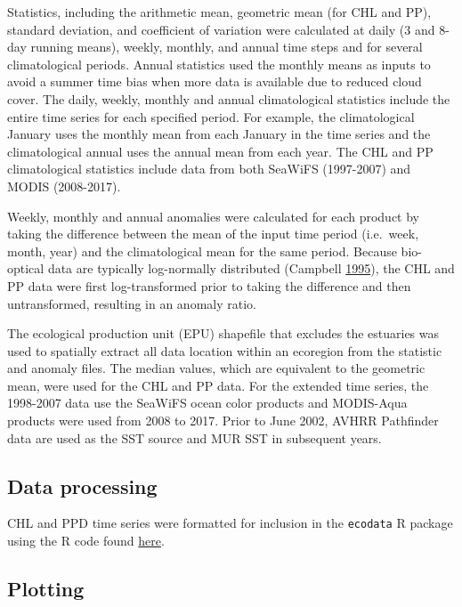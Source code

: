 \documentclass[
]{book}
\begin{document}
Statistics, including the arithmetic mean, geometric mean (for CHL and PP), standard deviation, and coefficient of variation were calculated at daily (3 and 8-day running means), weekly, monthly, and annual time steps and for several climatological periods. Annual statistics used the monthly means as inputs to avoid a summer time bias when more data is available due to reduced cloud cover. The daily, weekly, monthly and annual climatological statistics include the entire time series for each specified period. For example, the climatological January uses the monthly mean from each January in the time series and the climatological annual uses the annual mean from each year. The CHL and PP climatological statistics include data from both SeaWiFS (1997-2007) and MODIS (2008-2017).

Weekly, monthly and annual anomalies were calculated for each product by taking the difference between the mean of the input time period (i.e.~week, month, year) and the climatological mean for the same period. Because bio-optical data are typically log-normally distributed (Campbell \protect\hyperlink{ref-SOE2}{1995}), the CHL and PP data were first log-transformed prior to taking the difference and then untransformed, resulting in an anomaly ratio.

The ecological production unit (EPU) shapefile that excludes the estuaries was used to spatially extract all data location within an ecoregion from the statistic and anomaly files. The median values, which are equivalent to the geometric mean, were used for the CHL and PP data. For the extended time series, the 1998-2007 data use the SeaWiFS ocean color products and MODIS-Aqua products were used from 2008 to 2017. Prior to June 2002, AVHRR Pathfinder data are used as the SST source and MUR SST in subsequent years.

\hypertarget{data-processing-6}{%
\subsection{Data processing}\label{data-processing-6}}

CHL and PPD time series were formatted for inclusion in the \texttt{ecodata} R package using the R code found \href{https://github.com/NOAA-EDAB/ecodata/blob/master/data-raw/get_chl_pp.R}{here}.

\hypertarget{plotting-5}{%
\subsection{Plotting}\label{plotting-5}}
\end{document}
